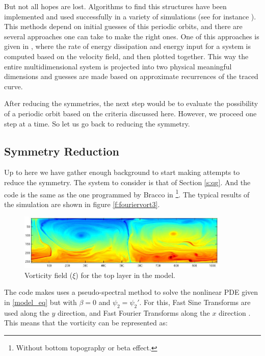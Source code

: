 But not all hopes are lost. Algorithms to find this structures have been implemented and used successfully in a variety of simulations (see for instance ). This methods depend on initial guesses of this periodic orbits, and there are several approaches one can take to make the right ones. One of this approaches is given in , where the rate of energy dissipation and energy input for a system is computed based on the velocity field, and then plotted together. This way the entire multidimensional system is projected into two physical meaningful dimensions and guesses are made based on approximate recurrences of the traced curve.  

After reducing the symmetries, the next step would be to evaluate the possibility of a periodic orbit based on the criteria discussed here.
However, we proceed one step at a time. So let us go back to reducing the symmetry.

\subsection{Symmetry Reduction}
Up to here we have gather enough background to start making attempts to
reduce the symmetry. The system to consider is that of Section
\ref{s:qg}. And the code is the same as the one programmed by Bracco in
\footnote{Without bottom topography or beta effect.}.
The typical results of the simulation are shown in figure
\ref{f:fouriervort3}.

    \begin{figure}[t]
    \begin{center}
    \includegraphics[width=0.9\textwidth, clip=true]{Vort_example}
    \end{center}
    \caption{Vorticity field ($\xi$) for the top layer in the model.}
    \label{f:fouriervort2}
    \end{figure}

The code makes uses a pseudo-spectral method to solve the nonlinear PDE
given in \ref{model_eq} but with $\beta=0$ and $\psi_2 =\psi_2'$. For
this, Fast Sine Transforms are used along the $y$ direction, and Fast
Fourier Transforms along the $x$ direction . This means that the
vorticity can be represented as:

